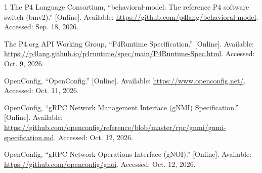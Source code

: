 \begin{thebibliography}{1}
The P4 Language Consortium, ``behavioral-model: The reference P4 software switch (bmv2).'' [Online]. Available: \url{https://github.com/p4lang/behavioral-model}. Accessed: Sep. 18, 2026.

The P4.org API Working Group, ``P4Runtime Specification.'' [Online]. Available: \url{https://p4lang.github.io/p4runtime/spec/main/P4Runtime-Spec.html}. Accessed: Oct. 9, 2026.

OpenConfig, ``OpenConfig.'' [Online]. Available: \url{https://www.openconfig.net/}. Accessed: Oct. 11, 2026.

OpenConfig, ``gRPC Network Management Interface (gNMI) Specification.'' [Online]. Available: \url{https://github.com/openconfig/reference/blob/master/rpc/gnmi/gnmi-specification.md}. Accessed: Oct. 12, 2026.

OpenConfig, ``gRPC Network Operations Interface (gNOI).'' [Online]. Available: \url{https://github.com/openconfig/gnoi}. Accessed: Oct. 12, 2026.

\end{thebibliography}

